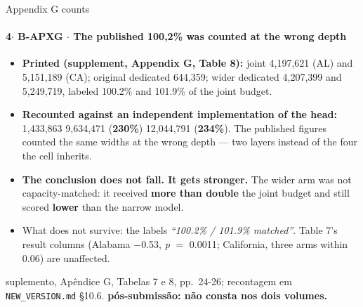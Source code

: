 \documentclass{beamer}
\begin{document}
\begin{frame}[noframenumbering]{Appendix G counts}
    \framesubtitle{\normalsize 4$\cdot$ \textbf{B-APXG} $\cdot$ The published 100,2\% was counted at the wrong depth}
    \hypertarget{bapxg}{}
    \small
    \begin{itemize}\setlength{\itemsep}{0pt}\setlength{\parskip}{0pt}
        \item \textbf{Printed (supplement, Appendix G, Table 8):} joint 4,197,621 (AL) and 5,151,189 (CA); original dedicated 644,359; wider dedicated 4,207,399 and 5,249,719, labeled 100.2\% and 101.9\% of the joint budget.
        \item \textbf{Recounted against an independent implementation of the head:} 1,433,863 \textbullet{} 9,634,471 (\textbf{230\%}) \textbullet{} 12,044,791 (\textbf{234\%}). The published figures counted the same widths at the wrong depth --- two layers instead of the four the cell inherits.
        \item \textbf{The conclusion does not fall. It gets stronger.} The wider arm was not capacity-matched: it received \textbf{more than double} the joint budget and still scored \textbf{lower} than the narrow model.
        \item What does not survive: the labels \textit{``100.2\% / 101.9\% matched''}. Table 7's result columns (Alabama $-$0.53, \textit{p} $=$ 0.0011; California, three arms within 0.06) are unaffected.
    \end{itemize}
    \vfill
    {\scriptsize
    \begin{minipage}[b]{0.775\linewidth}\raggedright\textcolor{black!70}{suplemento, Apêndice G, Tabelas 7 e 8, pp.~24-26; recontagem em \texttt{NEW\_VERSION.md} §10.6. \textbf{pós-submissão: não consta nos dois volumes.}}\end{minipage}\hfill
    \begin{minipage}[b]{0.20\linewidth}\raggedleft \hyperlink{b0}{}\end{minipage}}
\end{frame}
\end{document}
